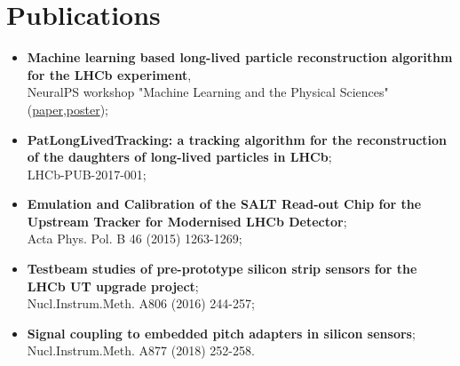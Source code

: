 \newpage

\section*{Publications}
			\begin{itemize}
			    \item \textbf{Machine learning based long-lived particle reconstruction algorithm for the LHCb experiment},\\ NeuralPS workshop "Machine Learning and the Physical Sciences"  (\textcolor{red}{\href{https://ml4physicalsciences.github.io/2020/files/NeurIPS_ML4PS_2020_148.pdf}{paper}},\textcolor{red}{\href{https://ml4physicalsciences.github.io/2020/files/NeurIPS_ML4PS_2020_148_poster.pdf}{poster}});
			    \item \textbf{PatLongLivedTracking: a tracking algorithm for the reconstruction of the daughters of long-lived particles in LHCb};\\ LHCb-PUB-2017-001;
				\item \textbf{Emulation and Calibration of the SALT Read-out Chip for the Upstream Tracker for Modernised LHCb Detector}; \\
				Acta Phys. Pol. B 46 (2015) 1263-1269;
				\item \textbf{Testbeam studies of pre-prototype silicon strip sensors for the LHCb UT upgrade project};  \\
				Nucl.Instrum.Meth. A806 (2016) 244-257;
				\item \textbf{Signal coupling to embedded pitch adapters in silicon sensors};\\
				Nucl.Instrum.Meth. A877 (2018) 252-258.
			\end{itemize}

